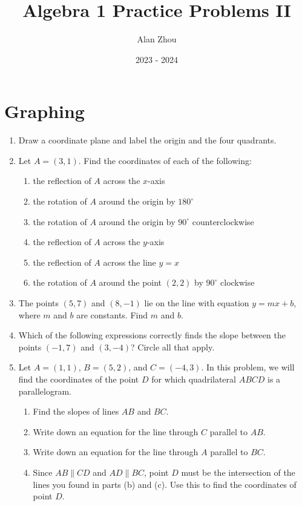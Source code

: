 \documentclass{article}
\title{Algebra 1 Practice Problems II}
\author{Alan Zhou}
\date{2023 - 2024}
\begin{document}
\maketitle

\section{Graphing}

\begin{enumerate}
\item Draw a coordinate plane and label the origin and the four quadrants.
\item Let $A = (3,1)$. Find the coordinates of each of the following:
\begin{enumerate}
\item the reflection of $A$ across the $x$-axis
\item the rotation of $A$ around the origin by $180^{\circ}$
\item the rotation of $A$ around the origin by $90^{\circ}$ counterclockwise
\item the reflection of $A$ across the $y$-axis
\item the reflection of $A$ across the line $y = x$
\item the rotation of $A$ around the point $(2,2)$ by $90^{\circ}$ clockwise
\end{enumerate}
\item The points $(5,7)$ and $(8,-1)$ lie on the line with equation $y = mx + b$, where $m$ and $b$ are constants. Find $m$ and $b$.
\item Which of the following expressions correctly finds the slope between the points $(-1,7)$ and $(3,-4)$? Circle all that apply.
\item Let $A = (1,1)$, $B = (5,2)$, and $C = (-4,3)$. In this problem, we will find the coordinates of the point $D$ for which quadrilateral $ABCD$ is a parallelogram.
\begin{enumerate}
\item Find the slopes of lines $AB$ and $BC$.
\item Write down an equation for the line through $C$ parallel to $AB$.
\item Write down an equation for the line through $A$ parallel to $BC$.
\item Since $AB\parallel CD$ and $AD\parallel BC$, point $D$ must be the intersection of the lines you found in parts (b) and (c). Use this to find the coordinates of point $D$.

\end{enumerate}
\end{enumerate}
\end{document}
